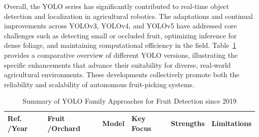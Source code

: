 \documentclass[pdflatex,sn-mathphys-num]{sn-jnl}
\begin{document}
Overall, the YOLO series has significantly contributed to real-time object detection and localization in agricultural robotics. The adaptations and continual improvements across YOLOv3, YOLOv4, and YOLOv5 have addressed core challenges such as detecting small or occluded fruit, optimizing inference for dense foliage, and maintaining computational efficiency in the field. Table~\ref{tab:yolo-based} provides a comparative overview of different YOLO versions, illustrating the specific enhancements that advance their suitability for diverse, real-world agricultural environments. These developments collectively promote both the reliability and scalability of autonomous fruit-picking systems.


\begin{table}[htbp]
	\centering
	\small
	\caption{Summary of YOLO Family Approaches for Fruit Detection since 2019} 
	\label{tab:yolo-based}
	\renewcommand{\arraystretch}{1.3}
	\begin{tabular}{p{1cm}p{1.2cm}p{1cm}p{2cm}p{2.5cm}p{2.8cm}}
	\toprule
	\textbf{Ref. \newline /Year} & \textbf{Fruit \newline /Orchard} & \textbf{Model} & \textbf{Key Focus} & \textbf{Strengths} & \textbf{Limitations} \\ \midrule
	

\end{tabular}
\end{table}
\end{document}
